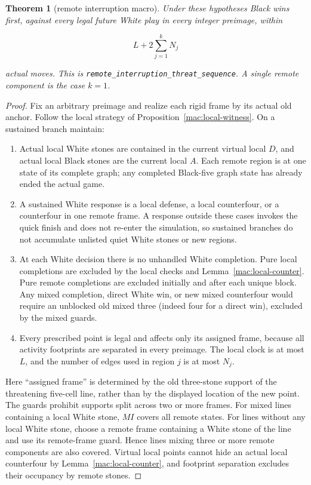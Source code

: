 \documentclass[11pt]{article}
\newtheorem{theorem}{Theorem}[section]
\theoremstyle{definition}
\theoremstyle{remark}
\begin{document}
\begin{theorem}[remote interruption macro]\label{mac:interruption}
Under these hypotheses Black wins first, against every legal future White play in every integer preimage, within

\[
 L+2\sum_{j=1}^kN_j
\]

actual moves. This is \texttt{remote\_interruption\_threat\_sequence}. A single remote component is the case \(k=1\).

\end{theorem}
\begin{proof}
Fix an arbitrary preimage and realize each rigid frame by its actual old anchor. Follow the local strategy of Proposition~\ref{mac:local-witness}. On a sustained branch maintain:

\begin{enumerate}
\item Actual local White stones are contained in the current virtual local \(D\), and actual local Black stones are the current local \(A\). Each remote region is at one state of its complete graph; any completed Black-five graph state has already ended the actual game.
\item A sustained White response is a local defense, a local counterfour, or a counterfour in one remote frame. A response outside these cases invokes the quick finish and does not re-enter the simulation, so sustained branches do not accumulate unlisted quiet White stones or new regions.
\item At each White decision there is no unhandled White completion. Pure local completions are excluded by the local checks and Lemma~\ref{mac:local-counter}. Pure remote completions are excluded initially and after each unique block. Any mixed completion, direct White win, or new mixed counterfour would require an unblocked old mixed three (indeed four for a direct win), excluded by the mixed guards.
\item Every prescribed point is legal and affects only its assigned frame, because all activity footprints are separated in every preimage. The local clock is at most \(L\), and the number of edges used in region \(j\) is at most \(N_j\).

\end{enumerate}
Here ``assigned frame'' is determined by the old three-stone support of the threatening five-cell line, rather than by the displayed location of the new point. The guards prohibit supports split across two or more frames. For mixed lines containing a local White stone, \(MI\) covers all remote states. For lines without any local White stone, choose a remote frame containing a White stone of the line and use its remote-frame guard. Hence lines mixing three or more remote components are also covered. Virtual local points cannot hide an actual local counterfour by Lemma~\ref{mac:local-counter}, and footprint separation excludes their occupancy by remote stones.


\end{proof}
\end{document}
